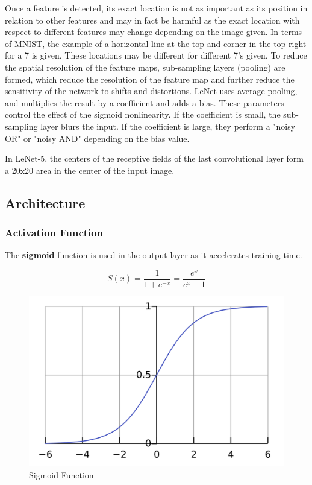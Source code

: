 \documentclass[11pt]{article}
\theoremstyle{definition}
\begin{document}
\bigskip

Once a feature is detected, its exact location is not as important as its position in relation to other features and may in fact be harmful as the exact location with respect to different features may change depending on the image given. In terms of MNIST, the example of a horizontal line at the top and corner in the top right for a 7 is given. These locations may be different for different 7's given. To reduce the spatial resolution of the feature maps, sub-sampling layers (pooling) are formed, which reduce the resolution of the feature map and further reduce the sensitivity of the network to shifts and distortions. LeNet uses average pooling, and multiplies the result by a coefficient and adds a bias. These parameters control the effect of the sigmoid nonlinearity. If the coefficient is small, the sub-sampling layer blurs the input. If the coefficient is large, they perform a "noisy OR" or "noisy AND" depending on the bias value.  

\bigskip

In LeNet-5, the centers of the receptive fields of the last convolutional layer form a 20x20 area in the center of the input image. 


\subsection{Architecture}

\subsubsection{Activation Function}
The \textbf{sigmoid} function is used in the output layer as it accelerates training time. 

\[ S(x) = \frac{1}{1+e^{-x}} = \frac{e^{x}}{e^{x}+1}\]



\begin{figure}[H]
\begin{center}
  \includegraphics[width=\linewidth,keepaspectratio]{images/sigmoid.png}
  \caption{Sigmoid Function}
\end{center}
\end{figure}
\end{document}
